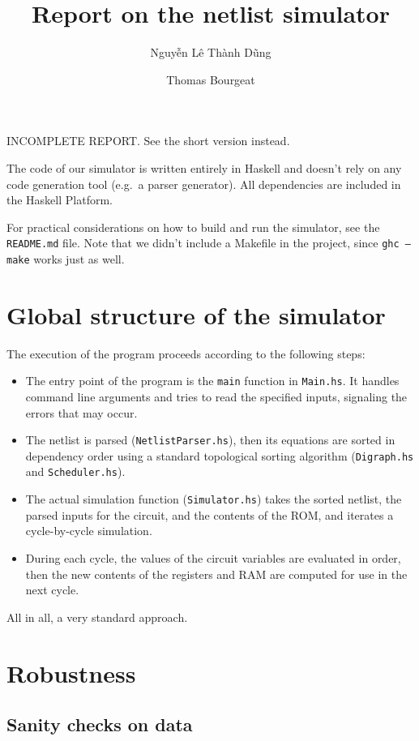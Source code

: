 \documentclass[a4paper, 11pt]{article}
\begin{document}
\title{Report on the netlist simulator}
\author{Nguyễn Lê Thành Dũng \and Thomas Bourgeat}

\maketitle

INCOMPLETE REPORT. See the short version instead.

The code of our simulator is written entirely in Haskell and doesn't rely on any code generation tool (e.g.\ a parser generator). All dependencies are included in the Haskell Platform.

For practical considerations on how to build and run the simulator, see the \texttt{README.md} file. Note that we didn't include a Makefile in the project, since \texttt{ghc --make} works just as well.

\section{Global structure of the simulator}

The execution of the program proceeds according to the following steps:
\begin{itemize}
\item The entry point of the program is the \texttt{main} function in \texttt{Main.hs}. It handles command line arguments and tries to read the specified inputs, signaling the errors that may occur.
\item The netlist is parsed (\texttt{NetlistParser.hs}), then its equations are sorted in dependency order using a standard topological sorting algorithm (\texttt{Digraph.hs} and \texttt{Scheduler.hs}).
\item The actual simulation function (\texttt{Simulator.hs}) takes the sorted netlist, the parsed inputs for the circuit, and the contents of the ROM, and iterates a cycle-by-cycle simulation.
\item During each cycle, the values of the circuit variables are evaluated in order, then the new contents of the registers and RAM are computed for use in the next cycle.
\end{itemize}
All in all, a very standard approach.

\section{Robustness}

\subsection{Sanity checks on data}
\end{document}
